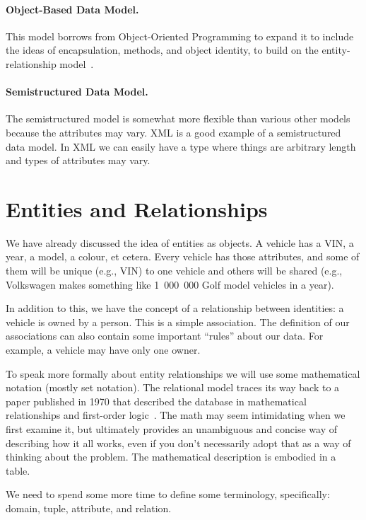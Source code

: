 \paragraph{Object-Based Data Model.} This model borrows from Object-Oriented Programming to expand it to include the ideas of encapsulation, methods, and object identity, to build on the entity-relationship model~\cite{dsc}.

\paragraph{Semistructured Data Model.} The semistructured model is somewhat more flexible than various other models because the attributes may vary. XML is a good example of a semistructured data model. In XML we can easily have a type where things are arbitrary length and types of attributes may vary. 

\section*{Entities and Relationships}

We have already discussed the idea of entities as objects. A vehicle has a VIN, a year, a model, a colour, et cetera. Every vehicle has those attributes, and some of them will be unique (e.g., VIN) to one vehicle and others will be shared (e.g., Volkswagen makes something like 1~000~000 Golf model vehicles in a year). 

In addition to this, we have the concept of a relationship between identities: a vehicle is owned by a person. This is a simple association. The definition of our associations can also contain some important ``rules'' about our data. For example, a vehicle may have only one owner.

To speak more formally about entity relationships we will use some mathematical notation (mostly set notation). The relational model traces its way back to a paper published in 1970 that described the database in mathematical relationships and first-order logic~\cite{codd}. The math may seem intimidating when we first examine it, but ultimately provides an unambiguous and concise way of describing how it all works, even if you don't necessarily adopt that as a way of thinking about the problem. The mathematical description is embodied in a table. 

We need to spend some more time to define some terminology, specifically: domain, tuple, attribute, and relation.  

